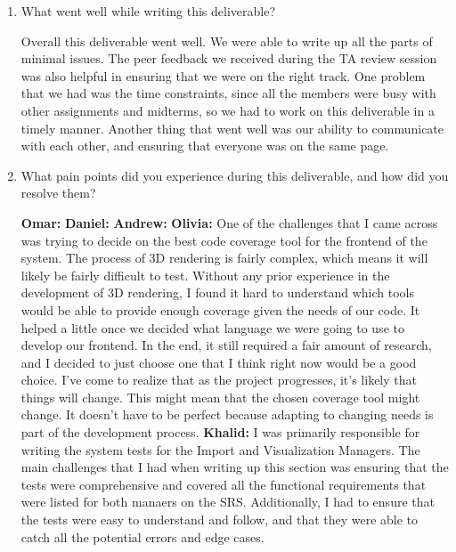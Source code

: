 \documentclass[12pt, titlepage]{article}
\begin{document}
\begin{enumerate}
  \item What went well while writing this deliverable? 

  Overall this deliverable went well. We were able to write up all the parts of minimal issues. The peer feedback we received during the TA review session was also helpful in ensuring that we were on the right track. One problem that we had was the time constraints, since all the members were busy with other assignments and midterms, so we had to work on this deliverable in a timely manner. Another thing that went well was our ability to communicate with each other, and ensuring that everyone was on the same page.

  \item What pain points did you experience during this deliverable, and how
    did you resolve them?
  

\textbf{Omar: }
\newline
\textbf{Daniel: } 
\newline
\newline
\textbf{Andrew: } 
\newline
\newline
\textbf{Olivia: } One of the challenges that I came across was trying to decide on the best code coverage tool for the frontend of the system. The process of 3D rendering is fairly complex, which means it will likely be fairly difficult to test. Without any prior experience in the development of 3D rendering, I found it hard to understand which tools would be able to provide enough coverage given the needs of our code. It helped a little once we decided what language we were going to use to develop our frontend. In the end, it still required a fair amount of research, and I decided to just choose one that I think right now would be a good choice. I’ve come to realize that as the project progresses, it’s likely that things will change. This might mean that the chosen coverage tool might change. It doesn’t have to be perfect because adapting to changing needs is part of the development process.
\newline
\newline
\textbf{Khalid: }I was primarily responsible for writing the system tests for the Import and Visualization Managers. The main challenges that I had when writing up this section was ensuring that the tests were comprehensive and covered all the functional requirements that were listed for both manaers on the SRS. Additionally, I had to ensure that the tests were easy to understand and follow, and that they were able to catch all the potential errors and edge cases.


\end{enumerate}
\end{document}
